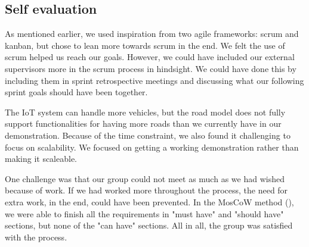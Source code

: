 \subsection{Self evaluation}
As mentioned earlier, we used inspiration from two agile frameworks: scrum and kanban, but chose to lean more towards scrum in the end. We felt the use of scrum helped us reach our goals. However, we could have included our external supervisors more in the scrum process in hindsight. We could have done this by including them in sprint retrospective meetings and discussing what our following sprint goals should have been together.

The IoT system can handle more vehicles, but the road model does not fully support functionalities for having more roads than we currently have in our demonstration. Because of the time constraint, we also found it challenging to focus on scalability. We focused on getting a working demonstration rather than making it scaleable.  

One challenge was that our group could not meet as much as we had wished because of work. If we had worked more throughout the process, the need for extra work, in the end, could have been prevented. In the MosCoW method (), we were able to finish all the requirements in "must have" and "should have" sections, but none of the "can have" sections. All in all, the group was satisfied with the process.

